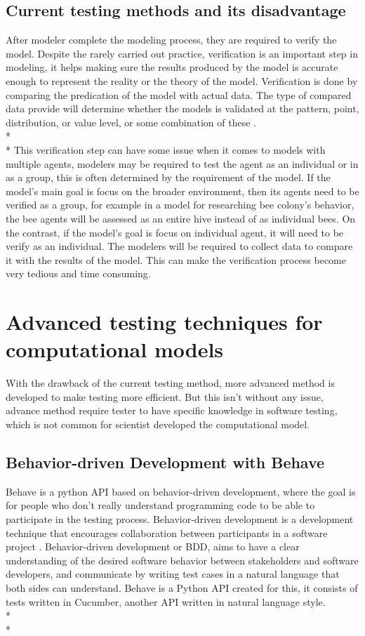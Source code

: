 \subsection{Current testing methods and its disadvantage}
After modeler complete the modeling process, they are required to verify the model. 
Despite the rarely carried out practice, verification is an important step in modeling, it helps making sure the results produced by the model is accurate enough to represent the reality or the theory of the model. Verification is done by comparing the predication of the model with actual data. The type of compared data provide will determine whether the models is validated at the pattern, point, distribution, or value level, or some combination of these \cite{Reference12}. \\*\\*
This verification step can have some issue when it comes to models with multiple agents, modelers may be required to test the agent as an individual or in as a group, this is often determined by the requirement of the model. If the model’s main goal is focus on the broader environment, then its agents need to be verified as a group, for example in a model for researching bee colony’s behavior, the bee agents will be assessed as an entire hive instead of as individual bees. On the contrast, if the model’s goal is focus on individual agent, it will need to be verify as an individual.
The modelers will be required to collect data to compare it with the results of the model. This can make the verification process become very tedious and time consuming. 

\section{Advanced testing techniques for computational models}
With the drawback of the current testing method, more advanced method is developed to make testing more efficient. But this isn’t without any issue, advance method require tester to have specific knowledge in software testing, which is not common for scientist developed the computational model.

\subsection{Behavior-driven Development with Behave}
Behave is a python API based on behavior-driven development, where the goal is for people who don’t really understand programming code to be able to participate in the testing process. Behavior-driven development is a development technique that encourages collaboration between participants in a software project \cite{Reference13}. Behavior-driven development or BDD, aims to have a clear understanding of the desired software behavior between stakeholders and software developers, and communicate by writing test cases in a natural language that both sides can understand. Behave is a Python API created for this, it consists of tests written in Cucumber, another API written in natural language style. \\*\\*

